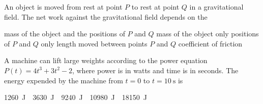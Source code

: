 \documentclass{../../oss-apphys-exam}
\begin{document}
\begin{multicols*}{2}
\begin{questions}
    
    \question An object is moved from rest at point $P$ to rest at point $Q$ in
    a gravitational field. The net work against the gravitational field depends
    on the
    \begin{choices}
      \choice mass of the object and the positions of $P$ and $Q$
      \choice mass of the object only
      \choice positions of $P$ and $Q$ only
      \choice length moved between points $P$ and $Q$
      \choice coefficient of friction
    \end{choices}


    \question A machine can lift large weights according to the power equation
    $P(t)=4t^3+3t^2-2$, where power is in watts and time is in seconds. The
    energy expended by the machine from $t=0$ to $t=\SI{10}\second$ is
    \begin{choices}
      \choice\SI{1260}\joule
      \choice\SI{3630}\joule
      \choice\SI{9240}\joule
      \choice\SI{10980}\joule
      \choice\SI{18150}\joule
    \end{choices}
    \columnbreak
    

\end{questions}
\end{multicols*}
\end{document}
